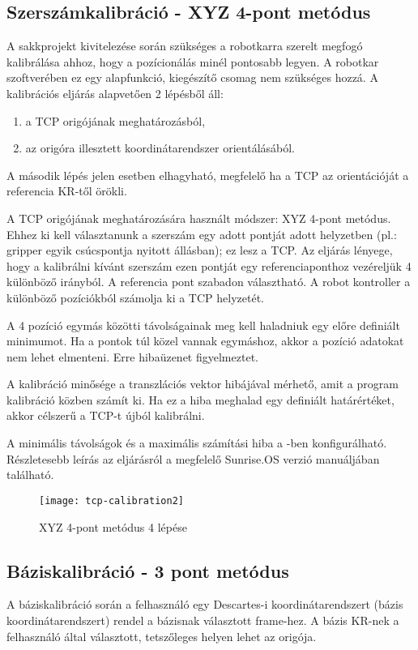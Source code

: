 \documentclass[../documentation.tex]{subfiles}
\begin{document}
\newpage
\subsection{Szerszámkalibráció - XYZ 4-pont metódus}
A sakkprojekt kivitelezése során szükséges a robotkarra szerelt megfogó kalibrálása ahhoz, hogy a pozícionálás minél pontosabb legyen. A robotkar szoftverében ez egy alapfunkció, kiegészítő csomag nem szükséges hozzá. A kalibrációs eljárás alapvetően 2 lépésből áll:
\begin{enumerate}
	\item a TCP origójának meghatározásból,
	\item az origóra illesztett koordinátarendszer orientálásából.
\end{enumerate}
A második lépés jelen esetben elhagyható, megfelelő ha a TCP az orientációját a referencia KR-től örökli. 

A TCP origójának meghatározására használt módszer: XYZ 4-pont metódus. Ehhez ki kell választanunk a szerszám egy adott pontját adott helyzetben (pl.: gripper egyik csúcspontja nyitott állásban); ez lesz a TCP. Az eljárás lényege, hogy a kalibrálni kívánt szerszám ezen pontját egy referenciaponthoz vezéreljük 4 különböző irányból. A referencia pont szabadon választható. A robot kontroller a különböző  pozíciókból számolja ki a TCP helyzetét.

A 4  pozíció egymás közötti távolságainak meg kell haladniuk egy előre definiált minimumot. Ha a pontok túl közel vannak egymáshoz, akkor a pozíció adatokat nem lehet elmenteni. Erre hibaüzenet figyelmeztet.

A kalibráció minősége a transzlációs vektor hibájával mérhető, amit a program kalibráció közben számít ki. Ha ez a hiba meghalad egy definiált határértéket, akkor célszerű a TCP-t újból kalibrálni.

A minimális távolságok és a maximális számítási hiba a -ben konfigurálható. Részletesebb leírás az eljárásról a megfelelő Sunrise.OS verzió manuáljában található\cite{sunrisemanual}.

\begin{figure}[h]
	\centering
	\texttt{[image: tcp-calibration2]}
	\caption{XYZ 4-pont metódus 4 lépése\cite{sunrisemanual}}
	\label{fig:tcp-examples}
\end{figure}

\subsection{Báziskalibráció - 3 pont metódus} \label{sec:basecalibration}
A báziskalibráció során a felhasználó egy Descartes-i koordinátarendszert (bázis koordinátarendszert) rendel a bázisnak választott frame-hez. A bázis KR-nek a felhasználó által választott, tetszőleges helyen lehet az origója.
\end{document}
